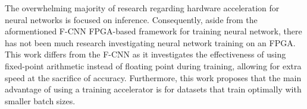 The overwhelming majority of research regarding hardware acceleration for neural networks is focused on inference. Consequently, aside from the aformentioned F-CNN FPGA-based framework for training neural network, there has not been much research investigating neural network training on an FPGA. This work differs from the F-CNN as it investigates the effectiveness of using fixed-point arithmetic instead of floating point during training, allowing for extra speed at the sacrifice of accuracy. Furthermore, this work proposes that the main advantage of using a training accelerator is for datasets that train optimally with smaller batch sizes.

